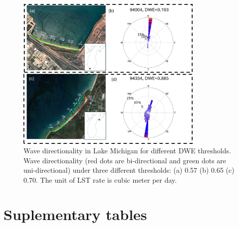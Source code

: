 \begin{figure}[htbp]
  \centering
  \includegraphics[width=0.8\textwidth]{appendix/resources/figure3-3a.jpg}
  \caption{Wave directionality in Lake Michigan for different DWE thresholds. Wave directionality (red dots are bi-directional and green dots are uni-directional) under three different thresholds: (a) 0.57 (b) 0.65 (c) 0.70. The unit of LST rate is cubic meter per day.}
  \label{fig:fig3.3a}
\end{figure}

\section{Suplementary tables}
\label{Suplementary tables}


